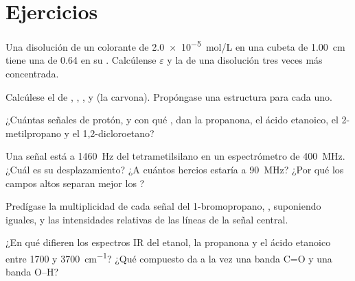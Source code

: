 \section{Ejercicios}

\begin{exercise}[$\star$]\label{exo:b1:structure-spectroscopy:1}
Una disolución de un colorante de \qty{2.0e-5}{mol/L} en una cubeta de
\qty{1.00}{cm} tiene una  de 0.64 en su .
Calcúlense $\varepsilon$ y la  de una disolución tres veces
más concentrada.
\end{exercise}

\begin{exercise}[$\star$]\label{exo:b1:structure-spectroscopy:2}
Calcúlese el  de , ,
,  y  (la carvona). Propóngase una
estructura para cada uno.
\end{exercise}

\begin{exercise}[$\star$]\label{exo:b1:structure-spectroscopy:3}
¿Cuántas señales de protón, y con qué , dan la propanona,
el ácido etanoico, el 2-metilpropano y el 1,2-dicloroetano?
\end{exercise}

\begin{exercise}[$\star$]\label{exo:b1:structure-spectroscopy:4}
Una señal está a \qty{1460}{Hz} del tetrametilsilano en un espectrómetro
de \qty{400}{MHz}. ¿Cuál es su desplazamiento? ¿A cuántos hercios estaría
a \qty{90}{MHz}? ¿Por qué los campos altos separan mejor los ?
\end{exercise}

\begin{exercise}[$\star\star$]\label{exo:b1:structure-spectroscopy:5}
Predígase la multiplicidad de cada señal del 1-bromopropano,
, suponiendo  iguales, y las
intensidades relativas de las líneas de la señal central.
\end{exercise}

\begin{exercise}[$\star\star$]\label{exo:b1:structure-spectroscopy:6}
¿En qué difieren los espectros IR del etanol, la propanona y el ácido
etanoico entre 1700 y \qty{3700}{cm^{-1}}? ¿Qué compuesto da a la vez una
banda C=O y una banda O--H?
\end{exercise}

